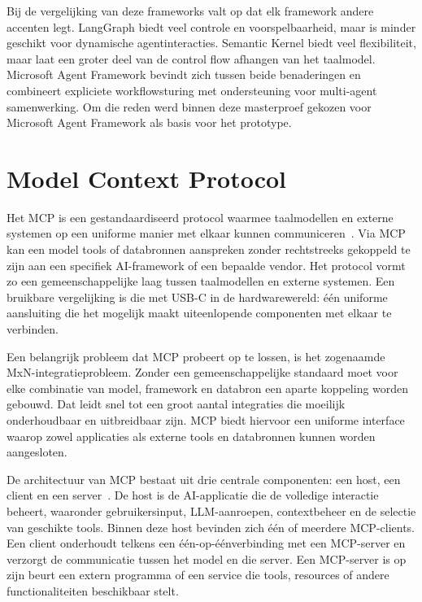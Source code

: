 Bij de vergelijking van deze frameworks valt op dat elk framework andere accenten legt. LangGraph biedt veel controle en voorspelbaarheid, maar is minder geschikt voor dynamische agentinteracties. Semantic Kernel biedt veel flexibiliteit, maar laat een groter deel van de control flow afhangen van het taalmodel. Microsoft Agent Framework bevindt zich tussen beide benaderingen en combineert expliciete workflowsturing met ondersteuning voor multi-agent samenwerking. Om die reden werd binnen deze masterproef gekozen voor Microsoft Agent Framework als basis voor het prototype.

\section{Model Context Protocol}
\label{sec:mcp}

Het \gls{MCP} is een gestandaardiseerd protocol waarmee taalmodellen en externe systemen op een uniforme manier met elkaar kunnen communiceren~\cite{anthropic2024mcp}. Via \gls{MCP} kan een model tools of databronnen aanspreken zonder rechtstreeks gekoppeld te zijn aan een specifiek \gls{AI}-framework of een bepaalde vendor. Het protocol vormt zo een gemeenschappelijke laag tussen taalmodellen en externe systemen. Een bruikbare vergelijking is die met USB-C in de hardwarewereld: één uniforme aansluiting die het mogelijk maakt uiteenlopende componenten met elkaar te verbinden.

Een belangrijk probleem dat \gls{MCP} probeert op te lossen, is het zogenaamde MxN-integratieprobleem. Zonder een gemeenschappelijke standaard moet voor elke combinatie van model, framework en databron een aparte koppeling worden gebouwd. Dat leidt snel tot een groot aantal integraties die moeilijk onderhoudbaar en uitbreidbaar zijn. \gls{MCP} biedt hiervoor een uniforme interface waarop zowel applicaties als externe tools en databronnen kunnen worden aangesloten.

De architectuur van \gls{MCP} bestaat uit drie centrale componenten: een host, een client en een server~\cite{huggingface2024mcp,microsoft2024mcpazure}. De host is de \gls{AI}-applicatie die de volledige interactie beheert, waaronder gebruikersinput, \gls{LLM}-aanroepen, contextbeheer en de selectie van geschikte tools. Binnen deze host bevinden zich één of meerdere \gls{MCP}-clients. Een client onderhoudt telkens een één-op-éénverbinding met een \gls{MCP}-server en verzorgt de communicatie tussen het model en die server. Een \gls{MCP}-server is op zijn beurt een extern programma of een service die tools, resources of andere functionaliteiten beschikbaar stelt.

